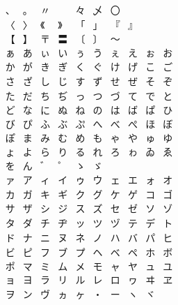 \documentclass{article}
\begin{document}
\[
  \begin{array}{cccccccccc}
    、&。&〃&　&々&乄&〇&　&　&　\\
    〈&〉&《&》&「&」&『&』&　&　\\
    【&】&〒&〓&〔&〕&〜&　&　&　\\
    ぁ&あ&ぃ&い&ぅ&う&ぇ&え&ぉ&お\\
    か&が&き&ぎ&く&ぐ&け&げ&こ&ご\\
    さ&ざ&し&じ&す&ず&せ&ぜ&そ&ぞ\\
    た&だ&ち&ぢ&っ&つ&づ&て&で&と\\
    ど&な&に&ぬ&ね&の&は&ば&ぱ&ひ\\
    び&ぴ&ふ&ぶ&ぷ&へ&べ&ぺ&ほ&ぼ\\
    ぽ&ま&み&む&め&も&ゃ&や&ゅ&ゆ\\
    ょ&よ&ら&り&る&れ&ろ&ゎ&ゐ&ゑ\\
    を&ん&゛&゜&ゝ&ゞ&　&　&　&　\\
    ァ&ア&ィ&イ&ゥ&ウ&ェ&エ&ォ&オ\\
    カ&ガ&キ&ギ&ク&グ&ケ&ゲ&コ&ゴ\\
    サ&ザ&シ&ジ&ス&ズ&セ&ゼ&ソ&ゾ\\
    タ&ダ&チ&ヂ&ッ&ツ&ヅ&テ&デ&ト\\
    ド&ナ&ニ&ヌ&ネ&ノ&ハ&バ&パ&ヒ\\
    ビ&ピ&フ&ブ&プ&ヘ&ベ&ペ&ホ&ボ\\
    ポ&マ&ミ&ム&メ&モ&ャ&ヤ&ュ&ユ\\
    ョ&ヨ&ラ&リ&ル&レ&ロ&ヮ&ヰ&ヱ\\
    ヲ&ン&ヴ&ヵ&ヶ&・&ー&ヽ&ヾ&　
  \end{array}
\]
\end{document}
